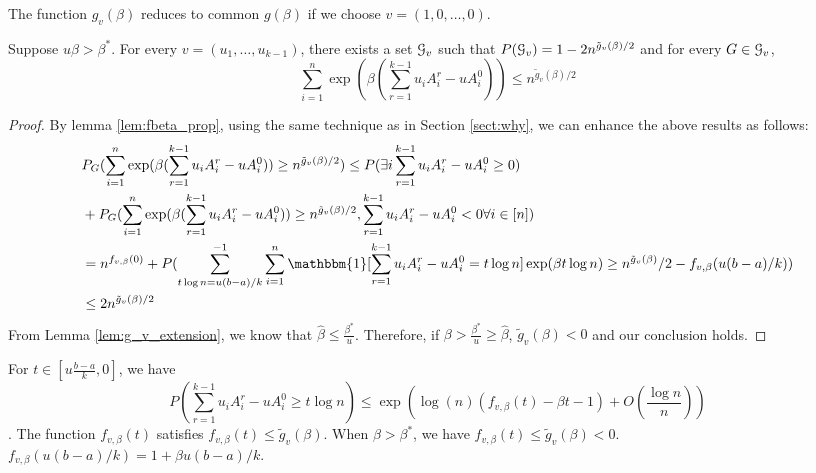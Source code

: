 \documentclass{article}
\begin{document}
\begin{remark}
	The function $g_v(\beta)$ reduces to common $g(\beta)$ if we choose $v=(1,0,\dots, 0)$.
\end{remark}
\begin{lemma}\label{lem:large}
	Suppose $u\beta > \beta^*$. For every $v=(u_1, \dots, u_{k-1})$,
	there exists a set $\mathcal{G}_v$ such that $P(\mathcal{G}_v) = 1-2n^{\tilde{g}_v(\beta)/2}$ and for every $G\in \mathcal{G}_v$,
	\begin{equation}
	\sum_{i=1}^n \exp(\beta(\sum_{r=1}^{k-1}u_i A_i^r - u A_i^0)) \leq n^{\tilde{g}_v(\beta)/2}
	\end{equation}
\end{lemma}
\begin{proof}

	By lemma \ref{lem:fbeta_prop},
	using the same technique as in Section \ref{sect:why}, we can enhance the above results as follows:
	\begin{align*}
		&P_G(\sum_{i=1}^n \exp(\beta(\sum_{r=1}^{k-1}u_i A_i^r - u A_i^0)) \geq n^{\tilde{g}_v(\beta)/2})
		 \leq P(\exists i \sum_{r=1}^{k-1}u_i A_i^r - u A_i^0 \geq 0 ) \\
		&+ 
		P_G(\sum_{i=1}^n \exp(\beta(\sum_{r=1}^{k-1}u_i A_i^r - u A_i^0)) \geq n^{\tilde{g}_v(\beta)/2}, \sum_{r=1}^{k-1}u_i A_i^r - u A_i^0 < 0 \forall i \in [n])
		\\
		&= n^{f_{v,\beta}(0)} + P(\sum_{t\log n = u(b-a)/k}^{-1}\sum_{i=1}^n \mathbbm{1}[\sum_{r=1}^{k-1} u_iA_i^r -u A_i^0=t\log n]\exp(\beta t \log n) \geq n^{\tilde{g}_v(\beta)}/2 - f_{v,\beta}(u(b-a)/k)) \\
		&\leq 2n^{\tilde{g}_v(\beta)/2}
	\end{align*}
	From Lemma \ref{lem:g_v_extension}, we know that $\hat{\beta}\leq \frac{\beta^*}{u}$.
	Therefore, if $\beta > \frac{\beta^*}{u} \geq \hat{\beta}$, $\tilde{g}_v(\beta) < 0$ and our conclusion holds.
\end{proof}
\begin{lemma}\label{lem:fbeta_prop}
	For $ t \in [u\frac{b-a}{k}, 0] $,
	we have
	$$
	P(\sum_{r=1}^{k-1} u_i A_i^r - u A_i^0 \geq t \log n) \leq \exp(\log(n) (f_{v,\beta}(t) - \beta t - 1) + O(\frac{\log n}{n}))
	$$.
	The function $f_{v,\beta}(t)$ satisfies $f_{v, \beta}(t) \leq \tilde{g}_v(\beta)$.
	When $\beta > \beta^*$, we have $f_{v, \beta}(t) \leq \tilde{g}_v(\beta) < 0$.
	$f_{v,\beta}(u(b-a)/k) = 1 + \beta u (b-a)/k$.
\end{lemma}
\end{document}
